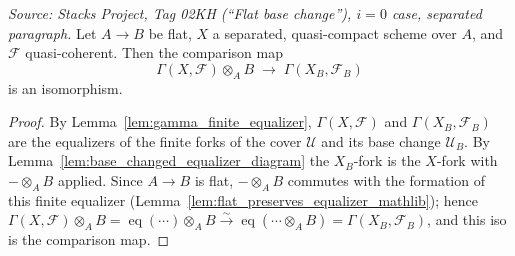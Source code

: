 \begin{lemma}
  \label{lem:flat_base_change_separated}
  \textit{Source: Stacks Project, Tag 02KH (``Flat base change''), $i=0$ case,
  separated paragraph.}
  Let \(A \to B\) be flat, \(X\) a separated, quasi-compact scheme over \(A\), and
  \(\mathcal{F}\) quasi-coherent. Then the comparison map
  \[
    \Gamma(X, \mathcal{F}) \otimes_A B \;\longrightarrow\; \Gamma(X_B, \mathcal{F}_B)
  \]
  is an isomorphism.
  \begin{proof}
    By Lemma~\ref{lem:gamma_finite_equalizer}, \(\Gamma(X,\mathcal{F})\) and
    \(\Gamma(X_B,\mathcal{F}_B)\) are the equalizers of the finite forks of the cover
    \(\mathcal{U}\) and its base change \(\mathcal{U}_B\). By
    Lemma~\ref{lem:base_changed_equalizer_diagram} the \(X_B\)-fork is the
    \(X\)-fork with \(- \otimes_A B\) applied. Since \(A \to B\) is flat,
    \(- \otimes_A B\) commutes with the formation of this finite equalizer
    (Lemma~\ref{lem:flat_preserves_equalizer_mathlib}); hence
    \(\Gamma(X,\mathcal{F}) \otimes_A B = \operatorname{eq}(\cdots) \otimes_A B
    \xrightarrow{\sim} \operatorname{eq}(\cdots \otimes_A B) = \Gamma(X_B,\mathcal{F}_B)\),
    and this iso is the comparison map.
  \end{proof}
\end{lemma}

